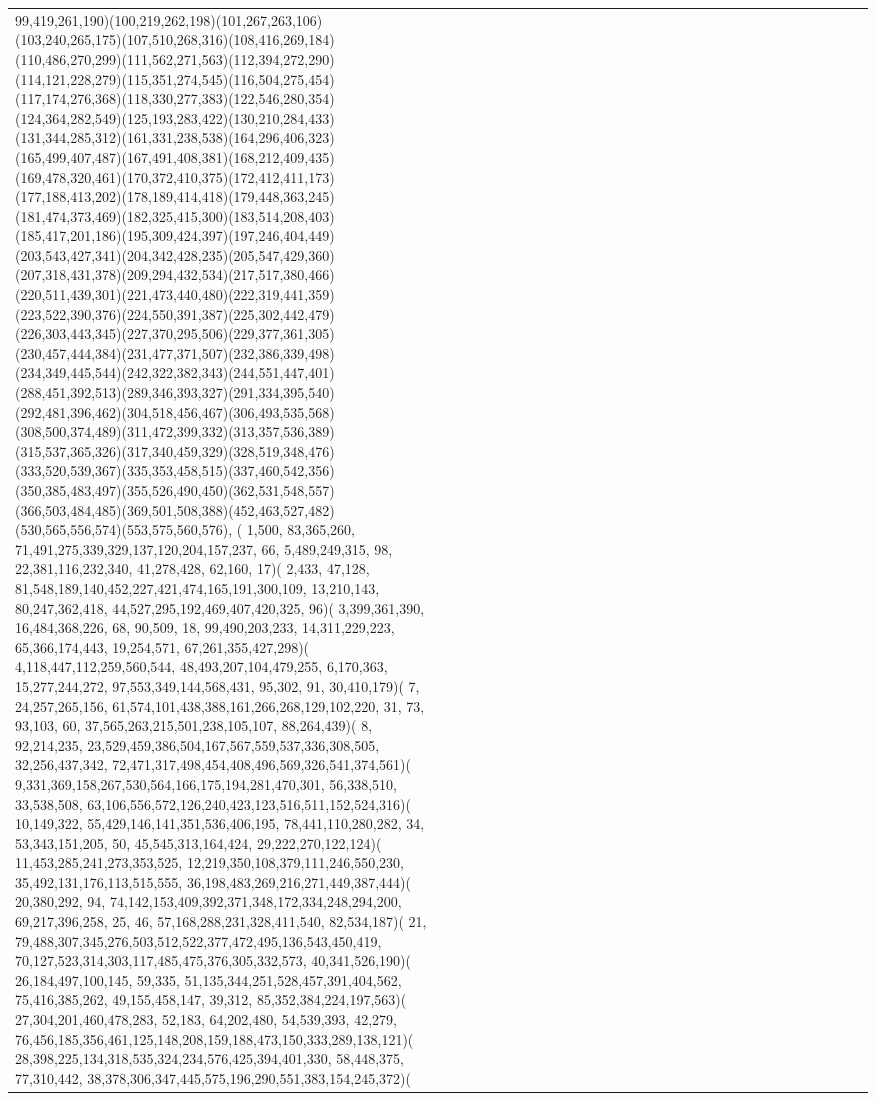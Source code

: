 \documentclass[varwidth=\maxdimen,border=10]{standalone}
\begin{document}
\begin{tabular}{@{}l@{}l@{}l@{}l@{}l@{}l@{}l@{}l@{}l@{}l@{}l@{}l@{}l@{}l@{}l@{}l@{}l@{}l@{}l@{}l@{}l@{}l@{}l@{}l@{}l@{}l@{}l@{}l@{}l@{}l@{}l@{}l@{}}
99,419,261,190)(100,219,262,198)(101,267,263,106)(103,240,265,175)(107,510,268,316)(108,416,269,184)(110,486,270,299)(111,562,271,563)(112,394,272,290)(114,121,228,279)(115,351,274,545)(116,504,275,454)(117,174,276,368)(118,330,277,383)(122,546,280,354)(124,364,282,549)(125,193,283,422)(130,210,284,433)(131,344,285,312)(161,331,238,538)(164,296,406,323)(165,499,407,487)(167,491,408,381)(168,212,409,435)(169,478,320,461)(170,372,410,375)(172,412,411,173)(177,188,413,202)(178,189,414,418)(179,448,363,245)(181,474,373,469)(182,325,415,300)(183,514,208,403)(185,417,201,186)(195,309,424,397)(197,246,404,449)(203,543,427,341)(204,342,428,235)(205,547,429,360)(207,318,431,378)(209,294,432,534)(217,517,380,466)(220,511,439,301)(221,473,440,480)(222,319,441,359)(223,522,390,376)(224,550,391,387)(225,302,442,479)(226,303,443,345)(227,370,295,506)(229,377,361,305)(230,457,444,384)(231,477,371,507)(232,386,339,498)(234,349,445,544)(242,322,382,343)(244,551,447,401)(288,451,392,513)(289,346,393,327)(291,334,395,540)(292,481,396,462)(304,518,456,467)(306,493,535,568)(308,500,374,489)(311,472,399,332)(313,357,536,389)(315,537,365,326)(317,340,459,329)(328,519,348,476)(333,520,539,367)(335,353,458,515)(337,460,542,356)(350,385,483,497)(355,526,490,450)(362,531,548,557)(366,503,484,485)(369,501,508,388)(452,463,527,482)(530,565,556,574)(553,575,560,576), (  1,500, 83,365,260, 71,491,275,339,329,137,120,204,157,237, 66,  5,489,249,315, 98, 22,381,116,232,340, 41,278,428, 62,160, 17)(  2,433, 47,128, 81,548,189,140,452,227,421,474,165,191,300,109, 13,210,143, 80,247,362,418, 44,527,295,192,469,407,420,325, 96)(  3,399,361,390, 16,484,368,226, 68, 90,509, 18, 99,490,203,233, 14,311,229,223, 65,366,174,443, 19,254,571, 67,261,355,427,298)(  4,118,447,112,259,560,544, 48,493,207,104,479,255,  6,170,363, 15,277,244,272, 97,553,349,144,568,431, 95,302, 91, 30,410,179)(  7, 24,257,265,156, 61,574,101,438,388,161,266,268,129,102,220, 31, 73, 93,103, 60, 37,565,263,215,501,238,105,107, 88,264,439)(  8, 92,214,235, 23,529,459,386,504,167,567,559,537,336,308,505, 32,256,437,342, 72,471,317,498,454,408,496,569,326,541,374,561)(  9,331,369,158,267,530,564,166,175,194,281,470,301, 56,338,510, 33,538,508, 63,106,556,572,126,240,423,123,516,511,152,524,316)( 10,149,322, 55,429,146,141,351,536,406,195, 78,441,110,280,282, 34, 53,343,151,205, 50, 45,545,313,164,424, 29,222,270,122,124)( 11,453,285,241,273,353,525, 12,219,350,108,379,111,246,550,230, 35,492,131,176,113,515,555, 36,198,483,269,216,271,449,387,444)( 20,380,292, 94, 74,142,153,409,392,371,348,172,334,248,294,200, 69,217,396,258, 25, 46, 57,168,288,231,328,411,540, 82,534,187)( 21, 79,488,307,345,276,503,512,522,377,472,495,136,543,450,419, 70,127,523,314,303,117,485,475,376,305,332,573, 40,341,526,190)( 26,184,497,100,145, 59,335, 51,135,344,251,528,457,391,404,562, 75,416,385,262, 49,155,458,147, 39,312, 85,352,384,224,197,563)( 27,304,201,460,478,283, 52,183, 64,202,480, 54,539,393, 42,279, 76,456,185,356,461,125,148,208,159,188,473,150,333,289,138,121)( 28,398,225,134,318,535,324,234,576,425,394,401,330, 58,448,375, 77,310,442, 38,378,306,347,445,575,196,290,551,383,154,245,372)( 
\end{tabular}
\end{document}
